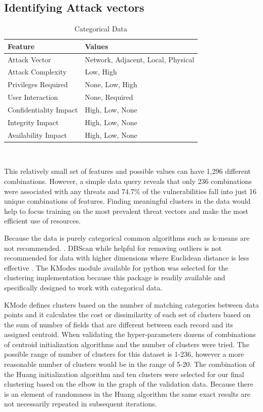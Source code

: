 \documentclass{article} %
\begin{document}
\subsection{Identifying Attack vectors}
\begin{table}[h!]
\begin{center}
\begin{tabular}{ |l|l| } \hline
Feature & Values\\\hline
Attack Vector & Network, Adjacent, Local, Physical  \\ 
Attack Complexity & Low, High  \\ 
Privileges Required & None, Low, High  \\ 
User Interaction & None, Required  \\ 
Confidentiality Impact & High, Low, None\\
Integrity Impact & High, Low, None\\
Availability Impact & High, Low, None\\
\hline
\end{tabular}
\end{center}
\caption{Categorical Data} \\
\label{table:1}
\end{table}

This relatively small set of features and possible values can have 1,296 different combinations.  However, a simple data query reveals that only 236 combinations were associated with any threats and 74.7\% of the vulnerabilities fall into just 16 unique combinations of features.  Finding meaningful clusters in the data would help to focus training on the most prevalent threat vectors and make the most efficient use of resources.  

Because the data is purely categorical common algorithms such as k-means are not recommended. \cite{}.  DBScan while helpful for removing outliers is not recommended for data with higher dimensions where Euclidean distance is less effective \cite{}.  The KModes module available for python was selected for the clustering implementation \cite{https://pypi.org/project/kmodes/}  because this package is readily available and specifically designed to work with categorical data.

KMode defines clusters based on the number of matching categories between data points and it calculates the cost or dissimilarity of each set of clusters based on the sum of number of fields that are different between each record and its assigned centroid.  When validating the hyper-parameters dozens of combinations of centroid initialization algorithms and the number of clusters were tried.  The possible range of number of clusters for this dataset is 1-236, however a more reasonable number of clusters would be in the range of 5-20.  The combination of the Huang initialization algorithm and ten clusters were selected for our final clustering based on the elbow in the graph of the validation data.  Because there is an element of randomness in the Huang algorithm the same exact results are not necessarily repeated in subsequent iterations.
\end{document}
